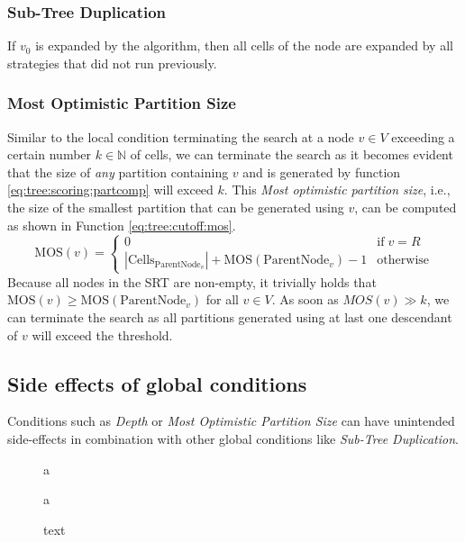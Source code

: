 			\subsubsection{Sub-Tree Duplication}

				If $v_0$ is expanded by the algorithm, then all cells of the node are expanded by all strategies that did not run previously.


			\subsubsection{Most Optimistic Partition Size}

				Similar to the local condition terminating the search at a node $v \in V$ exceeding a certain number $k \in \mathbb{N}$ of cells, we can terminate the search as it becomes evident that the size of \textit{any} partition containing $v$ and is generated by function \ref{eq:tree:scoring:partcomp} will exceed $k$.
				This \textit{Most optimistic partition size}, i.e., the size of the smallest partition that can be generated using $v$, can be computed as shown in Function \ref{eq:tree:cutoff:mos}.
				\begin{equation}
				\label{eq:tree:cutoff:mos}
					\mathrm{MOS}(v) = \begin{cases}
						0 & \text{if} \; v = R \\
						|\mathrm{Cells}_{\mathrm{ParentNode}_v}| + \mathrm{MOS}(\mathrm{ParentNode}_v) - 1 & \mathrm{otherwise}
					\end{cases}
				\end{equation}
				Because all nodes in the \ac{SRT} are non-empty, it trivially holds that $\mathrm{MOS}(v) \geq \mathrm{MOS}(\mathrm{ParentNode}_v)$ for all $v \in V$.
				As soon as $MOS(v) \gg k$, we can terminate the search as all partitions generated using at last one descendant of $v$ will exceed the threshold.

		\subsection{Side effects of global conditions}

			Conditions such as \textit{Depth} or \textit{Most Optimistic Partition Size} can have unintended side-effects in combination with other global conditions like \textit{Sub-Tree Duplication}.

			\begin{figure}[ht!]
				\centering
				\begin{minipage}[t]{0.45\textwidth}
					\vspace{0pt}
					
					\caption{a}
				\end{minipage}
				\begin{minipage}[t]{0.45\textwidth}
					\vspace{0pt}
					
					\vfill
					\caption{a}
				\end{minipage}
				\caption{text}
				\label{fig:tree:cutoff:mos}
			\end{figure}

